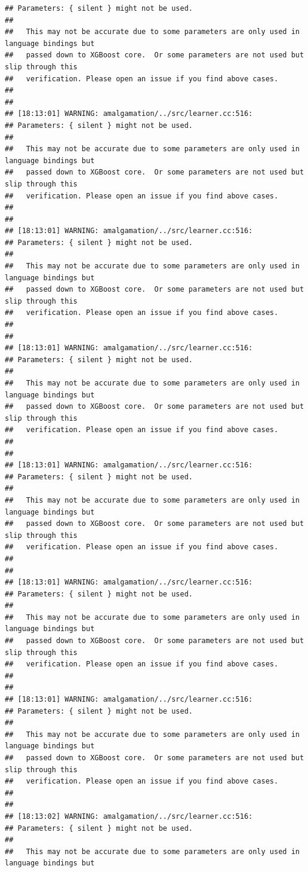 \documentclass[AMS,STIX2COL]{WileyNJD-v2}\usepackage[]{graphicx}\usepackage[]{color}
\makeatletter
\newenvironment{kframe}{%
 \def\at@end@of@kframe{}%
 \ifinner\ifhmode%
  \def\at@end@of@kframe{\end{minipage}}%
  \begin{minipage}{\columnwidth}%
 \fi\fi%
 \def\FrameCommand##1{\hskip\@totalleftmargin \hskip-\fboxsep
 \colorbox{shadecolor}{##1}\hskip-\fboxsep
     \hskip-\linewidth \hskip-\@totalleftmargin \hskip\columnwidth}%
 \MakeFramed {\advance\hsize-\width
   \@totalleftmargin\z@ \linewidth\hsize
   \@setminipage}}%
 {\par\unskip\endMakeFramed%
 \at@end@of@kframe}
\newenvironment{knitrout}{}{} %
\makeatother
\begin{document}
\begin{knitrout}
\begin{kframe}
\begin{verbatim}
## Parameters: { silent } might not be used.
## 
##   This may not be accurate due to some parameters are only used in language bindings but
##   passed down to XGBoost core.  Or some parameters are not used but slip through this
##   verification. Please open an issue if you find above cases.
## 
## 
## [18:13:01] WARNING: amalgamation/../src/learner.cc:516: 
## Parameters: { silent } might not be used.
## 
##   This may not be accurate due to some parameters are only used in language bindings but
##   passed down to XGBoost core.  Or some parameters are not used but slip through this
##   verification. Please open an issue if you find above cases.
## 
## 
## [18:13:01] WARNING: amalgamation/../src/learner.cc:516: 
## Parameters: { silent } might not be used.
## 
##   This may not be accurate due to some parameters are only used in language bindings but
##   passed down to XGBoost core.  Or some parameters are not used but slip through this
##   verification. Please open an issue if you find above cases.
## 
## 
## [18:13:01] WARNING: amalgamation/../src/learner.cc:516: 
## Parameters: { silent } might not be used.
## 
##   This may not be accurate due to some parameters are only used in language bindings but
##   passed down to XGBoost core.  Or some parameters are not used but slip through this
##   verification. Please open an issue if you find above cases.
## 
## 
## [18:13:01] WARNING: amalgamation/../src/learner.cc:516: 
## Parameters: { silent } might not be used.
## 
##   This may not be accurate due to some parameters are only used in language bindings but
##   passed down to XGBoost core.  Or some parameters are not used but slip through this
##   verification. Please open an issue if you find above cases.
## 
## 
## [18:13:01] WARNING: amalgamation/../src/learner.cc:516: 
## Parameters: { silent } might not be used.
## 
##   This may not be accurate due to some parameters are only used in language bindings but
##   passed down to XGBoost core.  Or some parameters are not used but slip through this
##   verification. Please open an issue if you find above cases.
## 
## 
## [18:13:01] WARNING: amalgamation/../src/learner.cc:516: 
## Parameters: { silent } might not be used.
## 
##   This may not be accurate due to some parameters are only used in language bindings but
##   passed down to XGBoost core.  Or some parameters are not used but slip through this
##   verification. Please open an issue if you find above cases.
## 
## 
## [18:13:02] WARNING: amalgamation/../src/learner.cc:516: 
## Parameters: { silent } might not be used.
## 
##   This may not be accurate due to some parameters are only used in language bindings but

\end{verbatim}
\end{kframe}
\end{knitrout}
\end{document}
